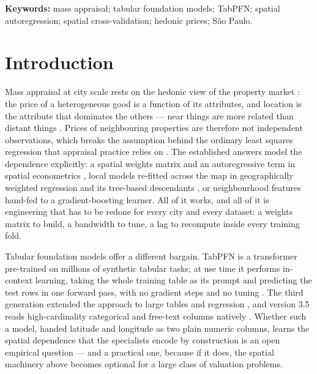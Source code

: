 \documentclass[11pt,a4paper]{article}
\begin{document}
\noindent\textbf{Keywords:} mass appraisal; tabular foundation models; TabPFN; spatial
autoregression; spatial cross-validation; hedonic prices; São Paulo.

\section{Introduction}
\label{sec:intro}

Mass appraisal at city scale rests on the hedonic view of the property market
\citep{rosen1974}: the price of a heterogeneous good is a function of its attributes, and
location is the attribute that dominates the others --- near things are more related than distant
things \citep{tobler1970}. Prices of neighbouring properties are therefore not independent
observations, which breaks the assumption behind the ordinary least squares regression that
appraisal practice relies on \citep{anselin1988}. The established answers model the dependence
explicitly: a spatial weights matrix and an autoregressive term in spatial econometrics
\citep{anselin1988,lesage2009}, local models re-fitted across the map in geographically weighted
regression \citep{fotheringham2002} and its tree-based descendants \citep{grekousis2025}, or
neighbourhood features hand-fed to a gradient-boosting learner. All of it works, and all of it is
engineering that has to be redone for every city and every dataset: a weights matrix to build, a
bandwidth to tune, a lag to recompute inside every training fold.

Tabular foundation models offer a different bargain. TabPFN is a transformer
\citep{vaswani2017} pre-trained on millions of synthetic tabular tasks; at use time it performs
in-context learning, taking the whole training table as its prompt and predicting the test rows
in one forward pass, with no gradient steps and no tuning
\citep{hollmann2023tabpfn,hollmann2025nature}. The third generation extended the approach to
large tables and regression \citep{priorlabs2026tabpfn3}, and version 3.5 reads
high-cardinality categorical and free-text columns natively \citep{priorlabs2026tabpfn35}.
Whether such a model, handed latitude and longitude as two plain numeric columns, learns the
spatial dependence that the specialists encode by construction is an open empirical question ---
and a practical one, because if it does, the spatial machinery above becomes optional for a large
class of valuation problems.
\end{document}
